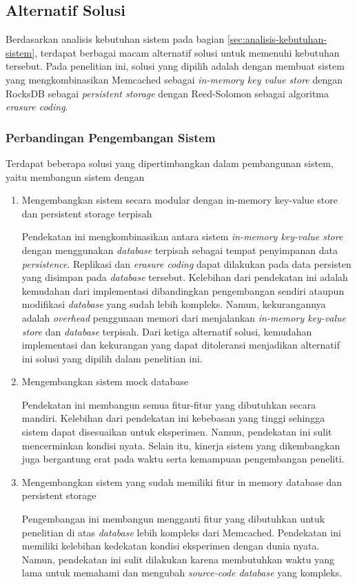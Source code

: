 \subsection{Alternatif Solusi}
\label{sec:alternatif-solusi}

Berdasarkan analisis kebutuhan sistem pada bagian \ref{sec:analisis-kebutuhan-sistem}, terdapat berbagai macam alternatif solusi untuk memenuhi kebutuhan tersebut. Pada penelitian ini, solusi yang dipilih adalah dengan membuat sistem yang mengkombinasikan Memcached sebagai \textit{in-memory key value store} dengan RocksDB sebagai \textit{persistent storage} dengan Reed-Solomon sebagai algoritma \textit{erasure coding}.

\subsubsection{Perbandingan Pengembangan Sistem}

Terdapat beberapa solusi yang dipertimbangkan dalam pembangunan sistem, yaitu membangun sistem dengan 

\begin{enumerate}
  \item Mengembangkan sistem secara modular dengan in-memory key-value store dan persistent storage terpisah
  
  Pendekatan ini mengkombinasikan antara sistem \textit{in-memory key-value store} dengan menggunakan \textit{database} terpisah sebagai tempat penyimpanan data \textit{persistence}. Replikasi dan \textit{erasure coding} dapat dilakukan pada data persisten yang disimpan pada \textit{database} tersebut. Kelebihan dari pendekatan ini adalah kemudahan dari implementasi dibandingkan pengembangan sendiri ataupun modifikasi \textit{database} yang sudah lebih kompleks. Namun, kekurangannya adalah \textit{overhead} penggunaan memori dari menjalankan \textit{in-memory key-value store} dan \textit{database} terpisah. Dari ketiga alternatif solusi, kemudahan implementasi dan kekurangan yang dapat ditoleransi menjadikan alternatif ini solusi yang dipilih dalam penelitian ini.


  \item Mengembangkan sistem mock database
  
  Pendekatan ini membangun semua fitur-fitur yang dibutuhkan secara mandiri. Kelebihan dari pendekatan ini kebebasan yang tinggi sehingga sistem dapat disesuaikan untuk eksperimen. Namun, pendekatan ini sulit mencerminkan kondisi nyata. Selain itu, kinerja sistem yang dikembangkan juga bergantung erat pada waktu serta kemampuan pengembangan peneliti.

  \item Mengembangkan sistem yang sudah memiliki fitur in memory database dan persistent storage
  
  Pengembangan ini membangun mengganti fitur yang dibutuhkan untuk penelitian di atas \textit{database} lebih kompleks dari Memcached. Pendekatan ini memiliki kelebihan kedekatan kondisi eksperimen dengan dunia nyata. Namun, pendekatan ini sulit dilakukan karena membutuhkan waktu yang lama untuk memahami dan mengubah \textit{source-code database} yang kompleks.
\end{enumerate}


